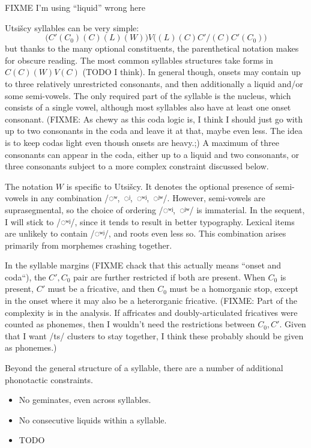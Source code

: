 \documentclass[12pt]{book} %
\begin{document}
FIXME I'm using ``liquid'' wrong here

Utsišcy syllables can be very simple:
$$\big( C'(C_0)(C)(L) (W) \big)V \big( (L)(C)C' / (C)C'(C_0) \big)$$
but thanks to the many optional constituents, the parenthetical notation makes for obscure reading.
The most common syllables structures take forms in $C(C)(W)V(C)$ (TODO I think).
In general though, onsets may contain up to three relatively unrestricted consonants, and then additionally a liquid and/or some semi-vowels.
The only required part of the syllable is the nucleus, which consists of a single vowel, although most syllables also have at least one onset consonant.
(FIXME: As chewy as this coda logic is, I think I should just go with up to two consonants in the coda and leave it at that, maybe even less. The idea is to keep codas light even thoush onsets are heavy.;)
A maximum of three consonants can appear in the coda, either up to a liquid and two consonants, or three consonants subject to a more complex constraint discussed below.

The notation $W$ is specific to Utsišcy.
It denotes the optional presence of semi-vowels in any combination /◌ʷ,~◌ʲ,~◌ʷʲ,~◌ʲʷ/.
However, semi-vowels are suprasegmental, so the choice of ordering /◌ʷʲ,~◌ʲʷ/ is immaterial.
In the sequent, I will stick to /◌ʷʲ/, since it tends to result in better typography.
Lexical items are unlikely to contain /◌ʷʲ/, and roots even less so.
This combination arises primarily from morphemes crashing together.

In the syllable margins (FIXME chack that this actually means ``onset and coda``), the $C', C_0$ pair are further restricted if both are present.
When $C_0$ is present, $C'$ must be a fricative, and then $C_0$ must be a homorganic stop, except in the onset where it may also be a heterorganic fricative.
(FIXME: Part of the complexity is in the analysis.
If affricates and doubly-articulated fricatives were counted as phonemes, then I wouldn't need the restrictions between $C_0, C'$.
Given that I want /ts/ clusters to stay together, I think these probably should be given as phonemes.)

Beyond the general structure of a syllable, there are a number of additional phonotactic constraints.
\begin{itemize}
\item No geminates, even across syllables.
\item No consecutive liquids within a syllable.
\item TODO
\end{itemize}
\end{document}
